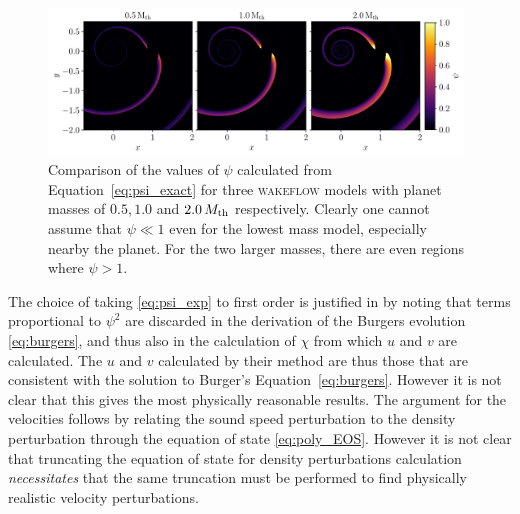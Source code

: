 \begin{figure}
    \centering
    \includegraphics[width = 0.98\textwidth]{figures/psi 2.pdf}
    \caption{Comparison of the values of $\psi$ calculated from Equation~\eqref{eq:psi_exact} for three \textsc{wakeflow} models with planet masses of $0.5, 1.0$ and $2.0 \, M_{\rm{th}}$ respectively. Clearly one cannot assume that $\psi \ll 1$ even for the lowest mass model, especially nearby the planet. For the two larger masses, there are even regions where $\psi > 1$.}
    \label{fig:psi_comparison}
\end{figure}

The choice of taking \eqref{eq:psi_exp} to first order is justified in \citet{bollati2021} by noting that terms proportional to $\psi^2$ are discarded in the derivation of the Burgers evolution \eqref{eq:burgers}, and thus also in the calculation of $\chi$ from which $u$ and $v$ are calculated.
The $u$ and $v$ calculated by their method are thus those that are consistent with the solution to Burger's Equation~\eqref{eq:burgers}. 
However it is not clear that this gives the most physically reasonable results.
The argument for the velocities follows by relating the sound speed perturbation to the density perturbation through the equation of state \eqref{eq:poly_EOS}.
However it is not clear that truncating the equation of state for density perturbations calculation \textit{necessitates} that the same truncation must be performed to find physically realistic velocity perturbations.

